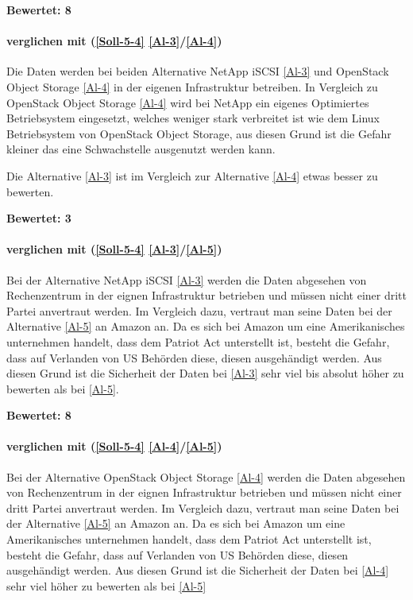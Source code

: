 \textbf{Bewertet: 8}

\paragraph*{  verglichen mit  (\ref{Soll-5-4} \ref{Al-3}/\ref{Al-4})}
Die Daten werden bei beiden Alternative NetApp iSCSI \ref{Al-3} und OpenStack Object Storage \ref{Al-4} in der eigenen Infrastruktur betreiben. In Vergleich zu OpenStack Object Storage \ref{Al-4} wird bei NetApp ein eigenes Optimiertes Betriebsystem eingesetzt, welches weniger stark verbreitet ist wie dem Linux Betriebsystem von OpenStack Object Storage, aus diesen Grund ist die Gefahr kleiner das eine Schwachstelle ausgenutzt werden kann.

Die Alternative  \ref{Al-3} ist im Vergleich zur Alternative  \ref{Al-4} etwas besser zu bewerten.

\textbf{Bewertet: 3}

\paragraph*{  verglichen mit  (\ref{Soll-5-4} \ref{Al-3}/\ref{Al-5})}

Bei der Alternative NetApp iSCSI \ref{Al-3} werden die Daten abgesehen von Rechenzentrum in der eignen Infrastruktur betrieben und müssen nicht einer dritt Partei anvertraut werden. Im Vergleich dazu, vertraut man seine Daten bei der Alternative \ref{Al-5} an Amazon an. Da es sich bei Amazon um eine Amerikanisches unternehmen handelt, dass dem Patriot Act unterstellt ist, besteht die Gefahr, dass auf Verlanden von US Behörden diese, diesen ausgehändigt werden. Aus diesen Grund ist die Sicherheit der Daten bei  \ref{Al-3} sehr viel bis absolut höher zu bewerten als bei \ref{Al-5}.

\textbf{Bewertet: 8}

\paragraph*{  verglichen mit  (\ref{Soll-5-4} \ref{Al-4}/\ref{Al-5})}
Bei der Alternative OpenStack Object Storage \ref{Al-4} werden die Daten abgesehen von Rechenzentrum in der eignen Infrastruktur betrieben und müssen nicht einer dritt Partei anvertraut werden. Im Vergleich dazu, vertraut man seine Daten bei der Alternative \ref{Al-5} an Amazon an. Da es sich bei Amazon um eine Amerikanisches unternehmen handelt, dass dem Patriot Act unterstellt ist, besteht die Gefahr, dass auf Verlanden von US Behörden diese, diesen ausgehändigt werden. Aus diesen Grund ist die Sicherheit der Daten bei  \ref{Al-4} sehr viel höher zu bewerten als bei  \ref{Al-5}

